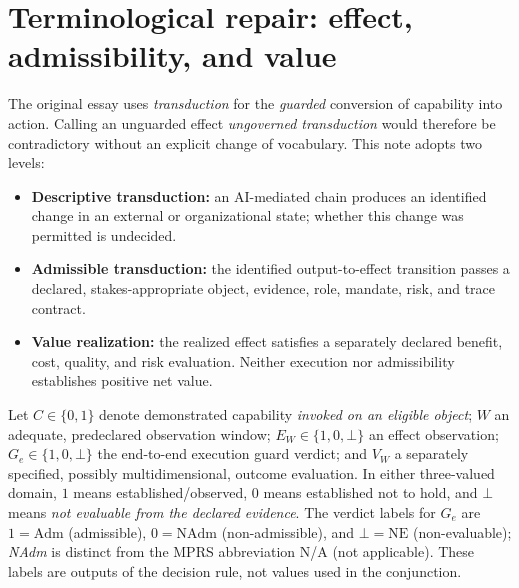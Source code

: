 \documentclass[11pt,a4paper]{article}
\begin{document}
\section{Terminological repair: effect, admissibility, and value}
The original essay uses \emph{transduction} for the \emph{guarded} conversion of capability into action. Calling an unguarded effect \emph{ungoverned transduction} would therefore be contradictory without an explicit change of vocabulary. This note adopts two levels:
\begin{itemize}
\item \textbf{Descriptive transduction:} an AI-mediated chain produces an identified change in an external or organizational state; whether this change was permitted is undecided.
\item \textbf{Admissible transduction:} the identified output-to-effect transition passes a declared, stakes-appropriate object, evidence, role, mandate, risk, and trace contract.
\item \textbf{Value realization:} the realized effect satisfies a separately declared benefit, cost, quality, and risk evaluation. Neither execution nor admissibility establishes positive net value.
\end{itemize}

Let $C\in\{0,1\}$ denote demonstrated capability \emph{invoked on an eligible object}; $W$ an adequate, predeclared observation window; $E_W\in\{1,0,\bot\}$ an effect observation; $G_e\in\{1,0,\bot\}$ the end-to-end execution guard verdict; and $V_W$ a separately specified, possibly multidimensional, outcome evaluation. In either three-valued domain, $1$ means established/observed, $0$ means established not to hold, and $\bot$ means \emph{not evaluable from the declared evidence}. The verdict labels for $G_e$ are $1=\mathrm{Adm}$ (admissible), $0=\mathrm{NAdm}$ (non-admissible), and $\bot=\mathrm{NE}$ (non-evaluable); \emph{NAdm} is distinct from the MPRS abbreviation N/A (not applicable). These labels are outputs of the decision rule, not values used in the conjunction.
\end{document}
